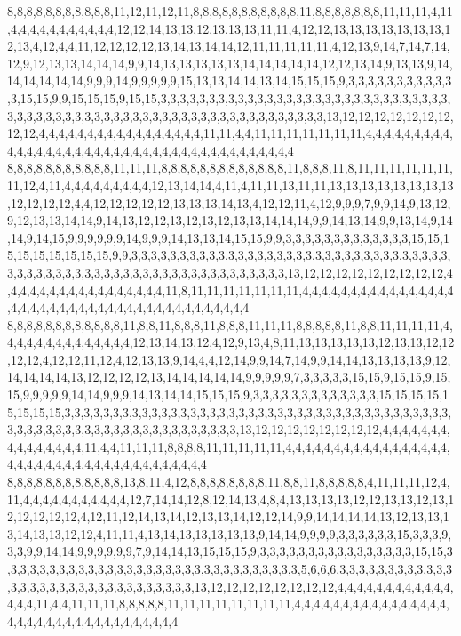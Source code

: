 8,8,8,8,8,8,8,8,8,8,8,11,12,11,12,11,8,8,8,8,8,8,8,8,8,8,8,11,8,8,8,8,8,8,8,11,11,11,4,11,4,4,4,4,4,4,4,4,4,4,4,12,12,14,13,13,12,13,13,13,11,11,4,12,12,13,13,13,13,13,13,13,12,13,4,12,4,4,11,12,12,12,12,13,14,13,14,14,12,11,11,11,11,11,4,12,13,9,14,7,14,7,14,12,9,12,13,13,14,14,14,9,9,14,13,13,13,13,13,14,14,14,14,14,12,12,13,14,9,13,13,9,14,14,14,14,14,14,9,9,9,14,9,9,9,9,9,15,13,13,14,14,13,14,15,15,15,9,3,3,3,3,3,3,3,3,3,3,3,3,15,15,9,9,15,15,15,9,15,15,3,3,3,3,3,3,3,3,3,3,3,3,3,3,3,3,3,3,3,3,3,3,3,3,3,3,3,3,3,3,3,3,3,3,3,3,3,3,3,3,3,3,3,3,3,3,3,3,3,3,3,3,3,3,3,3,3,3,3,3,3,3,3,13,12,12,12,12,12,12,12,12,12,4,4,4,4,4,4,4,4,4,4,4,4,4,4,4,4,4,11,11,4,4,11,11,11,11,11,11,11,4,4,4,4,4,4,4,4,4,4,4,4,4,4,4,4,4,4,4,4,4,4,4,4,4,4,4,4,4,4,4,4,4,4,4,4,4,4,4
8,8,8,8,8,8,8,8,8,8,8,11,11,11,8,8,8,8,8,8,8,8,8,8,8,8,8,11,8,8,8,11,8,11,11,11,11,11,11,11,12,4,11,4,4,4,4,4,4,4,4,4,12,13,14,14,4,11,4,11,11,13,11,11,13,13,13,13,13,13,13,13,12,12,12,12,4,4,12,12,12,12,12,13,13,13,14,13,4,12,12,11,4,12,9,9,9,7,9,9,14,9,13,12,9,12,13,13,14,14,9,14,13,12,12,13,12,13,12,13,13,14,14,14,9,9,14,13,14,9,9,13,14,9,14,14,9,14,15,9,9,9,9,9,9,14,9,9,9,14,13,13,14,15,15,9,9,3,3,3,3,3,3,3,3,3,3,3,3,3,15,15,15,15,15,15,15,15,15,9,9,3,3,3,3,3,3,3,3,3,3,3,3,3,3,3,3,3,3,3,3,3,3,3,3,3,3,3,3,3,3,3,3,3,3,3,3,3,3,3,3,3,3,3,3,3,3,3,3,3,3,3,3,3,3,3,3,3,3,3,3,3,3,13,12,12,12,12,12,12,12,12,12,4,4,4,4,4,4,4,4,4,4,4,4,4,4,4,4,4,11,8,11,11,11,11,11,11,11,4,4,4,4,4,4,4,4,4,4,4,4,4,4,4,4,4,4,4,4,4,4,4,4,4,4,4,4,4,4,4,4,4,4,4,4,4,4,4,4,4
8,8,8,8,8,8,8,8,8,8,8,8,11,8,8,11,8,8,8,11,8,8,8,11,11,11,8,8,8,8,8,11,8,8,11,11,11,11,4,4,4,4,4,4,4,4,4,4,4,4,4,4,12,13,14,13,12,4,12,9,13,4,8,11,13,13,13,13,13,12,13,13,12,12,12,12,4,12,12,11,12,4,12,13,13,9,14,4,4,12,14,9,9,14,7,14,9,9,14,14,13,13,13,13,9,12,14,14,14,14,13,12,12,12,12,13,14,14,14,14,14,9,9,9,9,9,7,3,3,3,3,3,15,15,9,15,15,9,15,15,9,9,9,9,9,14,14,9,9,9,14,13,14,14,15,15,15,9,3,3,3,3,3,3,3,3,3,3,3,3,3,15,15,15,15,15,15,15,15,3,3,3,3,3,3,3,3,3,3,3,3,3,3,3,3,3,3,3,3,3,3,3,3,3,3,3,3,3,3,3,3,3,3,3,3,3,3,3,3,3,3,3,3,3,3,3,3,3,3,3,3,3,3,3,3,3,3,3,3,3,3,3,3,13,12,12,12,12,12,12,12,12,4,4,4,4,4,4,4,4,4,4,4,4,4,4,4,11,4,4,11,11,11,8,8,8,8,11,11,11,11,11,4,4,4,4,4,4,4,4,4,4,4,4,4,4,4,4,4,4,4,4,4,4,4,4,4,4,4,4,4,4,4,4,4,4,4,4,4,4
8,8,8,8,8,8,8,8,8,8,8,8,13,8,11,4,12,8,8,8,8,8,8,8,8,11,8,8,11,8,8,8,8,8,4,11,11,11,12,4,11,4,4,4,4,4,4,4,4,4,4,4,12,7,14,14,12,8,12,14,13,4,8,4,13,13,13,13,12,12,13,13,12,13,12,12,12,12,12,4,12,11,12,14,13,14,12,13,13,14,12,12,14,9,9,14,14,14,14,13,12,13,13,13,14,13,13,12,12,4,11,11,4,13,14,13,13,13,13,13,9,14,14,9,9,9,9,3,3,3,3,3,3,15,3,3,3,9,3,3,9,9,14,14,9,9,9,9,9,9,7,9,14,14,13,15,15,15,9,3,3,3,3,3,3,3,3,3,3,3,3,3,3,3,3,15,15,3,3,3,3,3,3,3,3,3,3,3,3,3,3,3,3,3,3,3,3,3,3,3,3,3,3,3,3,3,3,3,5,6,6,6,3,3,3,3,3,3,3,3,3,3,3,3,3,3,3,3,3,3,3,3,3,3,3,3,3,3,3,3,3,3,3,13,12,12,12,12,12,12,12,12,4,4,4,4,4,4,4,4,4,4,4,4,4,4,4,11,4,4,11,11,11,8,8,8,8,8,11,11,11,11,11,11,11,11,4,4,4,4,4,4,4,4,4,4,4,4,4,4,4,4,4,4,4,4,4,4,4,4,4,4,4,4,4,4,4,4,4,4
